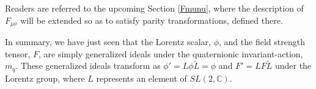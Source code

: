 \documentclass[letterpaper,12pt,titlepage,oneside,final]{book}
\begin{document}


Readers are referred to the upcoming Section \ref{Fmunu}, where the description of $F_{\mu\nu}$ will be extended so as to satisfy parity transformations, defined there.

\vspace{1cm}

In summary, we have just seen that the Lorentz scalar, $\phi$, and the field strength tensor, $F$, are simply generalized ideals under the quaternionic invariant-action, $m_q$.  These generalized ideals transform as $\phi' = L\phi \widetilde{L} = \phi$ and $F' = L F \widetilde{L}$ under the Lorentz group, where $L$ represents an element of $SL(2, \mathbb{C})$.


\end{document}
